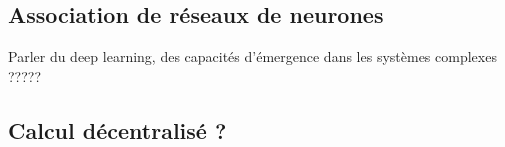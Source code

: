 \subsection{Association de réseaux de neurones}

Parler du deep learning, des capacités d'émergence dans les systèmes complexes ?????

\subsection{Calcul décentralisé ? }




%
%
%
